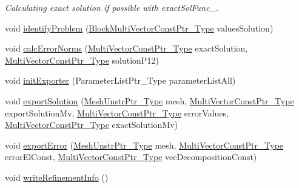 \begin{DoxyCompactItemize}
\begin{DoxyCompactList}\small\item\em Calculating exact solution if possible with exact\+Sol\+Func\+\_\+. \end{DoxyCompactList}\item 
void \hyperlink{classFEDD_1_1AdaptiveMeshRefinement_acce59127908a270c29318f32d0010513}{identify\+Problem} (\hyperlink{classFEDD_1_1AdaptiveMeshRefinement_a62f59092ab4dee90885c4d38b123ca9c}{Block\+Multi\+Vector\+Const\+Ptr\+\_\+\+Type} values\+Solution)
\item 
void \hyperlink{classFEDD_1_1AdaptiveMeshRefinement_a43e57f7bf39f588491888ebdde7b4010}{calc\+Error\+Norms} (\hyperlink{classFEDD_1_1AdaptiveMeshRefinement_ad8871639b0a35039184611ce286a446c}{Multi\+Vector\+Const\+Ptr\+\_\+\+Type} exact\+Solution, \hyperlink{classFEDD_1_1AdaptiveMeshRefinement_ad8871639b0a35039184611ce286a446c}{Multi\+Vector\+Const\+Ptr\+\_\+\+Type} solution\+P12)
\item 
void \hyperlink{classFEDD_1_1AdaptiveMeshRefinement_abad839ae02aaa2a4fe5f2bdb661e4dab}{init\+Exporter} (Parameter\+List\+Ptr\+\_\+\+Type parameter\+List\+All)
\item 
void \hyperlink{classFEDD_1_1AdaptiveMeshRefinement_adfbce243e105dff484cc3a516ced0019}{export\+Solution} (\hyperlink{classFEDD_1_1AdaptiveMeshRefinement_abc927c0c0253b094c3c53338f9128d20}{Mesh\+Unstr\+Ptr\+\_\+\+Type} mesh, \hyperlink{classFEDD_1_1AdaptiveMeshRefinement_ad8871639b0a35039184611ce286a446c}{Multi\+Vector\+Const\+Ptr\+\_\+\+Type} export\+Solution\+Mv, \hyperlink{classFEDD_1_1AdaptiveMeshRefinement_ad8871639b0a35039184611ce286a446c}{Multi\+Vector\+Const\+Ptr\+\_\+\+Type} error\+Values, \hyperlink{classFEDD_1_1AdaptiveMeshRefinement_ad8871639b0a35039184611ce286a446c}{Multi\+Vector\+Const\+Ptr\+\_\+\+Type} exact\+Solution\+Mv)
\item 
void \hyperlink{classFEDD_1_1AdaptiveMeshRefinement_ac428fd84d745170b6b83c5f3ec07fead}{export\+Error} (\hyperlink{classFEDD_1_1AdaptiveMeshRefinement_abc927c0c0253b094c3c53338f9128d20}{Mesh\+Unstr\+Ptr\+\_\+\+Type} mesh, \hyperlink{classFEDD_1_1AdaptiveMeshRefinement_ad8871639b0a35039184611ce286a446c}{Multi\+Vector\+Const\+Ptr\+\_\+\+Type} error\+El\+Const, \hyperlink{classFEDD_1_1AdaptiveMeshRefinement_ad8871639b0a35039184611ce286a446c}{Multi\+Vector\+Const\+Ptr\+\_\+\+Type} vec\+Decomposition\+Const)
\item 
void \hyperlink{classFEDD_1_1AdaptiveMeshRefinement_a7103d3aaea99021774a69bb80a6b0044}{write\+Refinement\+Info} ()
\item 

\end{DoxyCompactItemize}
